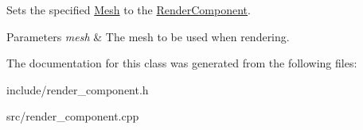 Sets the specified \hyperlink{class_blade_1_1_mesh}{Mesh} to the \hyperlink{class_blade_1_1_render_component}{Render\+Component}. 


\begin{DoxyParams}{Parameters}
{\em mesh} & The mesh to be used when rendering. \\
\hline
\end{DoxyParams}


The documentation for this class was generated from the following files\+:\begin{DoxyCompactItemize}
\item 
include/render\+\_\+component.\+h\item 
src/render\+\_\+component.\+cpp\end{DoxyCompactItemize}
